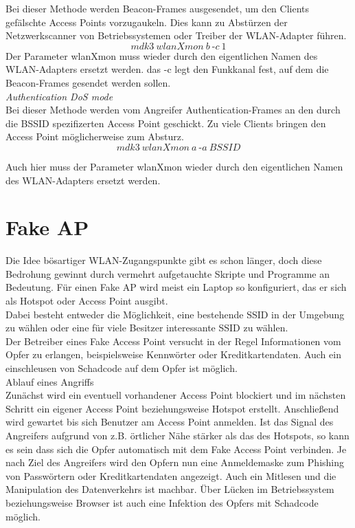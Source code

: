 Bei dieser Methode werden Beacon-Frames ausgesendet, um den Clients gefälschte Access Points vorzugaukeln. Dies kann zu Abstürzen der Netzwerkscanner von Betriebssystemen oder Treiber der WLAN-Adapter führen. \\
$$mdk3~wlanXmon~b~\text{-}c~1$$
Der Parameter wlanXmon muss wieder durch den eigentlichen Namen des WLAN-Adapters ersetzt werden.
das -c legt den Funkkanal fest, auf dem die Beacon-Frames gesendet werden sollen.\\ 

\textit{Authentication DoS mode}\\

Bei dieser Methode werden vom Angreifer Authentication-Frames an den durch die BSSID spezifizerten Access Point geschickt. Zu viele Clients bringen den Access Point möglicherweise zum Absturz.\\ 
$$mdk3~wlanXmon~a~\text{-}a~BSSID$$

Auch hier muss der Parameter wlanXmon wieder durch den eigentlichen Namen des WLAN-Adapters ersetzt werden. 

\section{Fake AP}
Die Idee bösartiger WLAN-Zugangspunkte gibt es schon länger, doch diese Bedrohung gewinnt durch vermehrt aufgetauchte Skripte und Programme an Bedeutung. Für einen Fake AP wird meist ein Laptop so konfiguriert, das er sich als Hotspot oder Access Point ausgibt.\\ Dabei besteht entweder die Möglichkeit, eine bestehende SSID in der Umgebung zu wählen oder eine für viele Besitzer interessante SSID zu wählen. \\

Der Betreiber eines Fake Access Point versucht in der Regel Informationen vom Opfer zu erlangen, beispielsweise Kennwörter oder Kreditkartendaten. Auch ein einschleusen von Schadcode auf dem Opfer ist möglich. \\

{\Large Ablauf eines Angriffs}\\

Zunächst wird ein eventuell vorhandener Access Point blockiert und 
im nächsten Schritt ein eigener Access Point beziehungsweise Hotspot erstellt. 
Anschließend wird gewartet bis sich Benutzer am Access Point anmelden. Ist das Signal des Angreifers aufgrund von z.B. örtlicher Nähe stärker als das des Hotspots, so kann es sein dass sich die Opfer automatisch mit dem Fake Access Point verbinden. Je nach Ziel des Angreifers wird den Opfern nun eine Anmeldemaske zum Phishing von Passwörtern oder Kreditkartendaten angezeigt. 
Auch ein Mitlesen und die Manipulation 	  des Datenverkehrs ist machbar. Über Lücken im Betriebssystem beziehungsweise Browser ist auch eine Infektion des Opfers mit Schadcode möglich. \\

